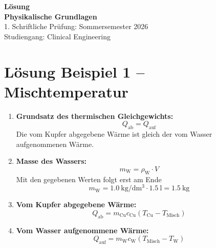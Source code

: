 \documentclass[11pt, a4paper]{article}
\begin{document}
\noindent
\vspace{9cm}
\begin{center}
    {\Huge \textbf{Lösung}} \\[1.5em]
    {\Large \textbf{Physikalische Grundlagen}} \\[1em]
    {\large 1. Schriftliche Prüfung: Sommersemester 2026} \\[1em]
    {\large Studiengang: Clinical Engineering}
\end{center}

\newpage

\section*{Lösung Beispiel 1 -- Mischtemperatur}
\begin{enumerate}
    \item \textbf{Grundsatz des thermischen Gleichgewichts:} \[
        Q_{\text{ab}} = Q_{\text{auf}}
    \]
    Die vom Kupfer abgegebene Wärme ist gleich der vom Wasser aufgenommenen Wärme.

    \item \textbf{Masse des Wassers:} \[
        m_{\text{W}} = \rho_{\text{W}} \cdot V
    \]
    Mit den gegebenen Werten folgt erst am Ende
    \[
        m_{\text{W}} = \SI{1.0}{\kilogram\per\deci\metre\cubed} \cdot \SI{1.5}{\litre} = \SI{1.5}{\kilogram}
    \]

    \item \textbf{Vom Kupfer abgegebene Wärme:} \[
        Q_{\text{ab}} = m_{\text{Cu}} c_{\text{Cu}} (T_{\text{Cu}} - T_{\text{Misch}})
    \]

    \item \textbf{Vom Wasser aufgenommene Wärme:} \[
        Q_{\text{auf}} = m_{\text{W}} c_{\text{W}} (T_{\text{Misch}} - T_{\text{W}})
    \]


\end{enumerate}
\end{document}
